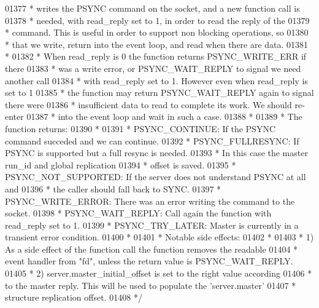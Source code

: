\begin{DoxyCode}
{{{{{{{{{{{{{{{{{{{{{{{{{{{{{{{{{{{{{{{{{{{{{{{{{{01377 \textcolor{comment}{ * writes the PSYNC command on the socket, and a new function call is}
01378 \textcolor{comment}{ * needed, with read\_reply set to 1, in order to read the reply of the}
01379 \textcolor{comment}{ * command. This is useful in order to support non blocking operations, so}
01380 \textcolor{comment}{ * that we write, return into the event loop, and read when there are data.}
01381 \textcolor{comment}{ *}
01382 \textcolor{comment}{ * When read\_reply is 0 the function returns PSYNC\_WRITE\_ERR if there}
01383 \textcolor{comment}{ * was a write error, or PSYNC\_WAIT\_REPLY to signal we need another call}
01384 \textcolor{comment}{ * with read\_reply set to 1. However even when read\_reply is set to 1}
01385 \textcolor{comment}{ * the function may return PSYNC\_WAIT\_REPLY again to signal there were}
01386 \textcolor{comment}{ * insufficient data to read to complete its work. We should re-enter}
01387 \textcolor{comment}{ * into the event loop and wait in such a case.}
01388 \textcolor{comment}{ *}
01389 \textcolor{comment}{ * The function returns:}
01390 \textcolor{comment}{ *}
01391 \textcolor{comment}{ * PSYNC\_CONTINUE: If the PSYNC command succeded and we can continue.}
01392 \textcolor{comment}{ * PSYNC\_FULLRESYNC: If PSYNC is supported but a full resync is needed.}
01393 \textcolor{comment}{ *                   In this case the master run\_id and global replication}
01394 \textcolor{comment}{ *                   offset is saved.}
01395 \textcolor{comment}{ * PSYNC\_NOT\_SUPPORTED: If the server does not understand PSYNC at all and}
01396 \textcolor{comment}{ *                      the caller should fall back to SYNC.}
01397 \textcolor{comment}{ * PSYNC\_WRITE\_ERROR: There was an error writing the command to the socket.}
01398 \textcolor{comment}{ * PSYNC\_WAIT\_REPLY: Call again the function with read\_reply set to 1.}
01399 \textcolor{comment}{ * PSYNC\_TRY\_LATER: Master is currently in a transient error condition.}
01400 \textcolor{comment}{ *}
01401 \textcolor{comment}{ * Notable side effects:}
01402 \textcolor{comment}{ *}
01403 \textcolor{comment}{ * 1) As a side effect of the function call the function removes the readable}
01404 \textcolor{comment}{ *    event handler from "fd", unless the return value is PSYNC\_WAIT\_REPLY.}
01405 \textcolor{comment}{ * 2) server.master\_initial\_offset is set to the right value according}
01406 \textcolor{comment}{ *    to the master reply. This will be used to populate the 'server.master'}
01407 \textcolor{comment}{ *    structure replication offset.}
01408 \textcolor{comment}{ */}
}}}}}}}}}}}}}}}}}}}}}}}}}}}}}}}}}}}}}}}}}}}}}}}}}}
\end{DoxyCode}

